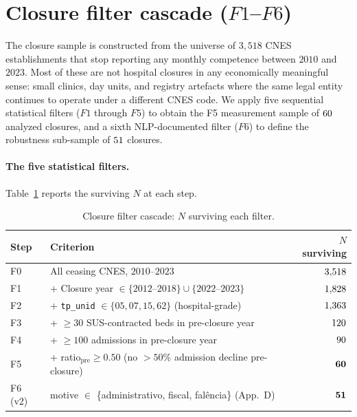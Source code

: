 \section{\texorpdfstring{Closure filter cascade ($F1$--$F6$)}{Closure filter cascade (F1--F6)}}
\label{app:filter}

The closure sample is constructed from the universe of $3{,}518$ CNES
establishments that stop reporting any monthly competence between
$2010$ and $2023$. Most of these are not hospital closures in any
economically meaningful sense: small clinics, day units, and registry
artefacts where the same legal entity continues to operate under a
different CNES code. We apply five sequential statistical filters
($F1$ through $F5$) to obtain the F5 measurement sample of $60$ analyzed
closures, and a sixth NLP-documented filter ($F6$) to define the
robustness sub-sample of $51$ closures.

\paragraph{The five statistical filters.} Table~\ref{tab:filter} reports
the surviving $N$ at each step.

\begin{table}[h!]
\centering
\caption{Closure filter cascade: $N$ surviving each filter.}
\label{tab:filter}
\small
\begin{tabular}{llr}
\toprule
Step & Criterion & $N$ surviving \\
\midrule
F0  & All ceasing CNES, $2010$--$2023$ & $3{,}518$ \\
F1  & + Closure year $\in \{2012\text{--}2018\} \cup \{2022\text{--}2023\}$ & $1{,}828$ \\
F2  & + \texttt{tp\_unid} $\in \{05, 07, 15, 62\}$ (hospital-grade) & $1{,}363$ \\
F3  & + $\geq 30$ SUS-contracted beds in pre-closure year & $120$ \\
F4  & + $\geq 100$ admissions in pre-closure year & $90$ \\
F5  & + ratio$_{\text{pre}} \geq 0.50$ (no $> 50\%$ admission decline pre-closure) & $\mathbf{60}$ \\
\midrule
F6 (v2) & motive $\in$ \{administrativo, fiscal, fal\^encia\} (App.~D) & $\mathbf{51}$ \\
\bottomrule
\end{tabular}
\end{table}

